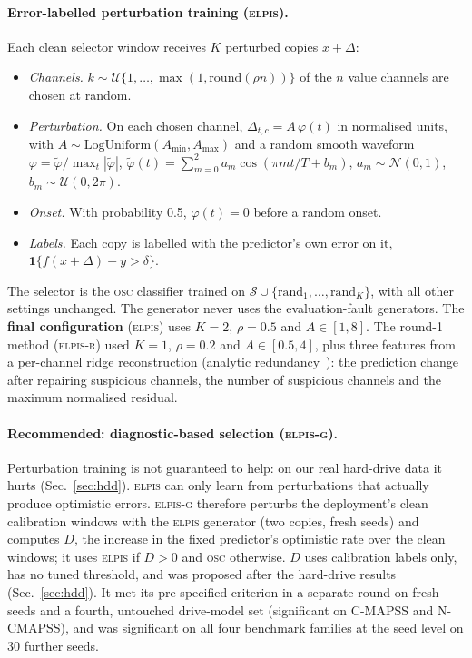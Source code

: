 \documentclass{esannV2}
\newcommand{\OSC}{\textsc{osc}}
\newcommand{\RPT}{\textsc{elpis}}
\newcommand{\Rone}{\textsc{elpis-r}}
\newcommand{\AUTOD}{\textsc{elpis-g}}
\begin{document}
\paragraph{Error-labelled perturbation training (\RPT).} Each clean selector window receives $K$ perturbed copies $x+\Delta$:
\begin{itemize}
\item \emph{Channels.} $k\sim\mathcal U\{1,\dots,\max(1,\mathrm{round}(\rho n))\}$ of the $n$ value channels are chosen at random.
\item \emph{Perturbation.} On each chosen channel, $\Delta_{t,c}=A\,\varphi(t)$ in normalised units, with $A\sim\mathrm{LogUniform}(A_{\min},A_{\max})$ and a random smooth waveform $\varphi=\tilde\varphi/\max_t|\tilde\varphi|$, $\tilde\varphi(t)=\sum_{m=0}^{2}a_m\cos(\pi m t/T+b_m)$, $a_m\sim\mathcal N(0,1)$, $b_m\sim\mathcal U(0,2\pi)$.
\item \emph{Onset.} With probability 0.5, $\varphi(t)=0$ before a random onset.
\item \emph{Labels.} Each copy is labelled with the predictor's own error on it, $\mathbf 1\{f(x+\Delta)-y>\delta\}$.
\end{itemize}
The selector is the \OSC{} classifier trained on $\mathcal S\cup\{\text{rand}_1,\dots,\text{rand}_K\}$, with all other settings unchanged. The generator never uses the evaluation-fault generators. The \textbf{final configuration} (\RPT) uses $K=2$, $\rho=0.5$ and $A\in[1,8]$. The round-1 method (\Rone) used $K=1$, $\rho=0.2$ and $A\in[0.5,4]$, plus three features from a per-channel ridge reconstruction (analytic redundancy~\cite{chow1984analytical}): the prediction change after repairing suspicious channels, the number of suspicious channels and the maximum normalised residual.

\paragraph{Recommended: diagnostic-based selection (\AUTOD).} Perturbation training is not guaranteed to help: on our real hard-drive data it hurts (Sec.~\ref{sec:hdd}). \RPT{} can only learn from perturbations that actually produce optimistic errors. \AUTOD{} therefore perturbs the deployment's clean calibration windows with the \RPT{} generator (two copies, fresh seeds) and computes $D$, the increase in the fixed predictor's optimistic rate over the clean windows; it uses \RPT{} if $D>0$ and \OSC{} otherwise. $D$ uses calibration labels only, has no tuned threshold, and was proposed after the hard-drive results (Sec.~\ref{sec:hdd}). It met its pre-specified criterion in a separate round on fresh seeds and a fourth, untouched drive-model set (significant on C-MAPSS and N-CMAPSS), and was significant on all four benchmark families at the seed level on 30 further seeds.
\end{document}

